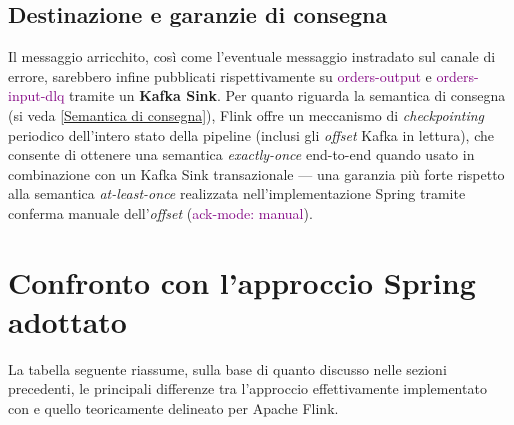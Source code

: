 \subsection{Destinazione e garanzie di consegna}
Il messaggio arricchito, così come l'eventuale messaggio instradato sul canale di errore, sarebbero infine pubblicati rispettivamente su \textcolor{purple}{orders-output} e \textcolor{purple}{orders-input-dlq} tramite un \textbf{Kafka Sink}. Per quanto riguarda la semantica di consegna (si veda \ref{Semantica di consegna}), Flink offre un meccanismo di \textit{checkpointing} periodico dell'intero stato della pipeline (inclusi gli \textit{offset} Kafka in lettura), che consente di ottenere una semantica \textit{exactly-once} end-to-end quando usato in combinazione con un Kafka Sink transazionale — una garanzia più forte rispetto alla semantica \textit{at-least-once} realizzata nell'implementazione Spring tramite conferma manuale dell'\textit{offset} (\textcolor{purple}{ack-mode: manual}).

\section{Confronto con l'approccio Spring adottato}
\label{Confronto con l'approccio Spring adottato}
La tabella seguente riassume, sulla base di quanto discusso nelle sezioni precedenti, le principali differenze tra l'approccio effettivamente implementato con  e quello teoricamente delineato per Apache Flink.

